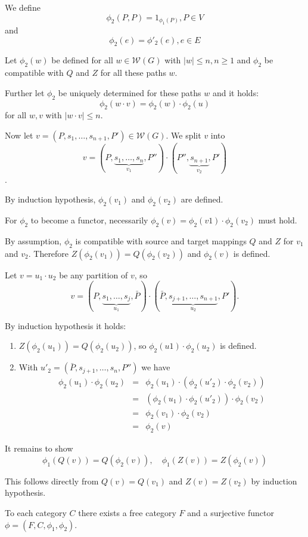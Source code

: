 We define \[ \phi_2(P,P) = 1_{\phi_1(P)}, P \in V \] and \[ \phi_2(e) =
\phi'_2(e), e \in E \]

Let $\phi_2(w)$ be defined for all $w \in \mathcal{W}(G)$ with $|w| \leq n, n
\geq 1$ and $\phi_2$ be compatible with $Q$ and $Z$ for all these paths $w$.

Further let $\phi_2$ be uniquely determined for these paths $w$ and it holds: \[
\phi_2(w \cdot v) = \phi_2(w) \cdot \phi_2(u) \]
for all $w, v$ with $|w \cdot v| \leq n$.

Now let $v = (P, s_1, \ldots, s_{n+1}, P') \in \mathcal{W}(G)$. We split $v$
into \[ v = (P, \underbrace{s_1, \ldots, s_n}_{v_1}, P'') \cdot (P'',
\underbrace{s_{n+1}}_{v_2}, P') \].

By induction hypothesis, $\phi_2(v_1)$ and $\phi_2(v_2)$ are defined.

For $\phi_2$ to become a functor, necessarily $\phi_2(v) = \phi_2(v1) \cdot
\phi_2(v_2)$ must hold.

By assumption, $\phi_2$ is compatible with source and target mappings $Q$ and
$Z$ for $v_1$ and $v_2$. Therefore $Z(\phi_2(v_1)) = Q(\phi_2(v_2))$ and
$\phi_2(v)$ is defined.

Let $v = u_1 \cdot u_2$ be any partition of $v$, so \[ v = (P, \underbrace{s_1,
\ldots, s_j}_{u_1}, \bar{P}) \cdot (\bar{P}, \underbrace{s_{j+1},
\ldots, s_{n+1}}_{u_2}, P'). \]

By induction hypothesis it holds:
\begin{enumerate}
  \item $Z(\phi_2(u_1)) = Q(\phi_2(u_2))$, so $\phi_2(u1) \cdot \phi_2(u_2)$ is
  defined.
  \item With $u'_2 = (\bar{P}, s_{j+1}, \ldots, s_n, P'')$ we have
  \begin{eqnarray*}
  \phi_2(u_1) \cdot \phi_2(u_2) & = & \phi_2(u_1) \cdot (\phi_2(u'_2) \cdot
  \phi_2(v_2)) \\
  & = & (\phi_2(u_1) \cdot \phi_2(u'_2)) \cdot \phi_2(v_2) \\
  & = & \phi_2(v_1) \cdot \phi_2(v_2) \\
  & = & \phi_2(v)
  \end{eqnarray*}
\end{enumerate}

It remains to show \[ \phi_1(Q(v)) = Q(\phi_2(v)),\quad \phi_1(Z(v)) =
Z(\phi_2(v)) \]

This follows directly from $Q(v) = Q(v_1)$ and $Z(v) = Z(v_2)$ by induction
hypothesis.

\begin{theorem}
To each category $C$ there exists a free category $F$ and a surjective functor
$\phi = (F, C, \phi_1, \phi_2)$.
\end{theorem}

